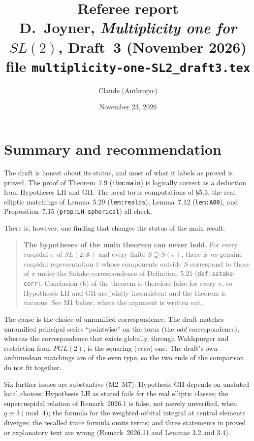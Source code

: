 \documentclass[12pt,letterpaper]{article}
\title{Referee report\\[1ex]
\large D.~Joyner, \emph{Multiplicity one for $SL(2)$}, Draft~3 (November 2026)\\
file \texttt{multiplicity-one-SL2\_draft3.tex}}
\author{Claude (Anthropic)}
\date{November 23, 2026}
\newcommand{\A}{\mathbb{A}}
\newcommand{\ov}[1]{\overline{#1}}
\theoremstyle{plain}
\begin{document}
\maketitle

\section{Summary and recommendation}

The draft is honest about its status, and most of what it labels as proved
is proved. The proof of Theorem~7.9 (\texttt{thm:main}) is logically
correct as a deduction from Hypotheses LH and GH. The local torus
computations of \S5.3, the real elliptic matchings of Lemma~5.29
(\texttt{lem:realds}), Lemma~7.12 (\texttt{lem:A00}), and
Proposition~7.15 (\texttt{prop:LH-spherical}) all check.

There is, however, one finding that changes the status of the main result.

\begin{quote}
\textbf{The hypotheses of the main theorem can never hold.} For every
cuspidal $\pi$ of $SL(2,\A)$ and every finite $S\supseteq S(\pi)$, there
is \emph{no} genuine cuspidal representation $\ov\pi$ whose components
outside $S$ correspond to those of $\pi$ under the Satake correspondence of
Definition~5.21 (\texttt{def:satake-corr}). Conclusion (b) of the theorem
is therefore false for every $\pi$, so Hypotheses LH and GH are jointly
inconsistent and the theorem is vacuous. See M1 below, where the argument
is written out.
\end{quote}

The cause is the choice of unramified correspondence. The draft matches
unramified principal series ``pointwise'' on the torus (the \emph{odd}
correspondence), whereas the correspondence that exists globally, through
Waldspurger and restriction from $PGL(2)$, is the squaring (\emph{even})
one. The draft's own archimedean matchings are of the even type, so the
two ends of the comparison do not fit together.

Six further issues are substantive (M2--M7): Hypothesis GH depends on
unstated local choices; Hypothesis LH as stated fails for the real elliptic
classes; the supercuspidal relation of Remark~2026.1 is false, not merely
unverified, when $q\equiv3\pmod4$; the formula for the weighted orbital
integral at central elements diverges; the recalled trace formula omits
terms; and three statements in proved or explanatory text are wrong
(Remark~2026.11 and Lemmas 3.2 and 3.4).
\end{document}
